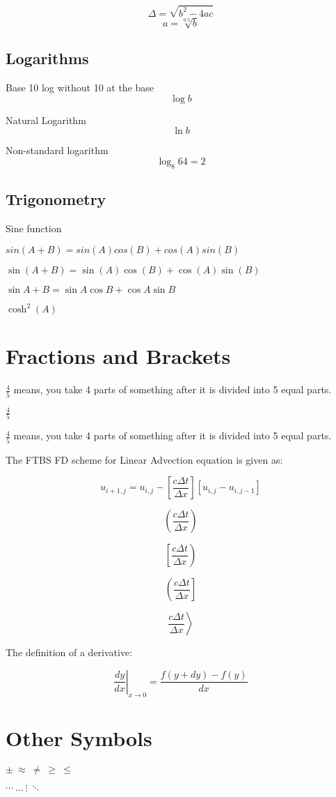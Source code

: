\documentclass[10pt,a4paper]{article}
\begin{document}
$$\Delta = \sqrt{b^2 -4ac}$$
$$ a = \sqrt[0.5]{b}$$

\subsection{Logarithms}
Base 10 log without 10 at the base
$$ \log{b} $$

Natural Logarithm
$$ \ln{b} $$

Non-standard logarithm
$$ \log_{8}{64} = 2 $$

\subsection{Trigonometry}

Sine function

$ sin(A+B) = sin(A)cos(B) + cos(A)sin(B)$

$ \sin(A+B) = \sin(A)\cos(B) + \cos(A)\sin(B)$

$ \sin{A+B} = \sin{A}\cos{B} + \cos{A}\sin{B}$

$\cosh^2(A)$

\section{Fractions and Brackets}

$\frac{4}{5}$ means, you take 4 parts of something after it is divided into 5 equal parts.

$\frac45$

$\displaystyle{\frac{4}{5}}$ means, you take 4 parts of something after it is divided into 5 equal parts.

The FTBS FD scheme for Linear Advection equation is given as:

$$ u_{i+1,j} = u_{i,j} - \left[\frac{c\Delta t}{\Delta x}\right][u_{i,j}-u_{i,j-1}]$$

$$ \left( \frac{c\Delta t}{\Delta x} \right)$$

$$ \left[ \frac{c\Delta t}{\Delta x} \right)$$

$$ \left( \frac{c\Delta t}{\Delta x} \right]$$

$$ \left. \frac{c\Delta t}{\Delta x} \right\rangle$$

The definition of a derivative:

$$ \left.\frac{dy}{dx}\right|_{x\rightarrow 0} = \frac{f(y+dy)-f(y)}{dx}$$

\section{Other Symbols}

$ \pm \ \approx \ \ne \ \ge \ \le $

$ \cdots \ \ldots \ \vdots \ \ddots $
\end{document}
